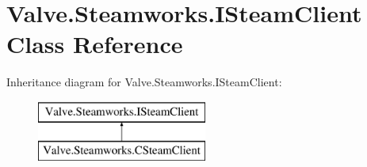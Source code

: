 \hypertarget{classValve_1_1Steamworks_1_1ISteamClient}{}\section{Valve.\+Steamworks.\+I\+Steam\+Client Class Reference}
\label{classValve_1_1Steamworks_1_1ISteamClient}
Inheritance diagram for Valve.\+Steamworks.\+I\+Steam\+Client\+:\begin{figure}[H]
\begin{center}
\leavevmode
\includegraphics[height=2.000000cm]{classValve_1_1Steamworks_1_1ISteamClient}
\end{center}
\end{figure}

